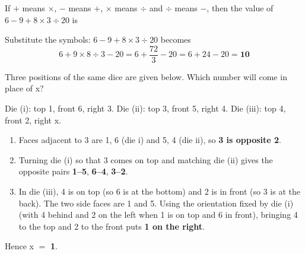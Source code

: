 If $+$ means $\times$, $-$ means $+$, $\times$ means $\div$ and $\div$ means $-$, then the value of $6-9+8\times3\div20$ is

Substitute the symbols: $6-9+8\times3\div20$ becomes
\[6+9\times8\div3-20=6+\frac{72}{3}-20=6+24-20=\mathbf{10}\]

Three positions of the same dice are given below. Which number will come in place of x?

\qquad{}\qquad{}

Die (i): top 1, front 6, right 3. Die (ii): top 3, front 5, right 4. Die (iii): top 4, front 2, right x.
\begin{enumerate}
\item Faces adjacent to 3 are 1, 6 (die i) and 5, 4 (die ii), so \textbf{3 is opposite 2}.
\item Turning die (i) so that 3 comes on top and matching die (ii) gives the opposite pairs \textbf{1--5}, \textbf{6--4}, \textbf{3--2}.
\item In die (iii), 4 is on top (so 6 is at the bottom) and 2 is in front (so 3 is at the back). The two side faces are 1 and 5. Using the orientation fixed by die (i) (with 4 behind and 2 on the left when 1 is on top and 6 in front), bringing 4 to the top and 2 to the front puts \textbf{1 on the right}.
\end{enumerate}
Hence x $=$ \textbf{1}.
